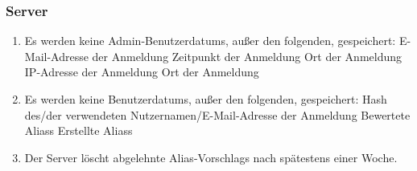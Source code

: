 \subsubsection{Server}

\begin{enumerate}
    \item Es werden keine \Gls{Admin}-\Glspl{Benutzerdatum}, außer den folgenden, gespeichert:
        \subitem E-Mail-Adresse der Anmeldung
        \subitem Zeitpunkt der Anmeldung
        \subitem Ort der Anmeldung
        \subitem \Gls{IP-Adresse} der Anmeldung
        \subitem Ort der Anmeldung
    \item Es werden keine \Glspl{Benutzerdatum}, außer den folgenden, gespeichert:
        \subitem \Gls{Hash} des/der verwendeten Nutzernamen/E-Mail-Adresse der Anmeldung
        \subitem Bewertete \Glspl{Alias} 
        \subitem Erstellte \Glspl{Alias} 
    \item Der \Gls{Server} löscht abgelehnte \Glspl{Alias-Vorschlag} nach spätestens einer Woche.
\end{enumerate}
